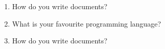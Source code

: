 \documentclass[12pt,onside,a4paper,article]{memoir}
\newcommand\blankpage{%
    \null
    \thispagestyle{empty}%
    \addtocounter{page}{-1}%
    \newpage}
\begin{document}
\begin{enumerate}
\item{How do you write documents?}
\begin{flushright}
\end{flushright}
\item{What is your favourite programming language?}
\begin{flushright}
\end{flushright}
\item{How do you write documents?}
\begin{flushright}
\end{flushright}
\end{enumerate}

\vspace*{4.5cm}
\begin{flushright}
 \end{flushright}

\clearpage\blankpage
\end{document}
